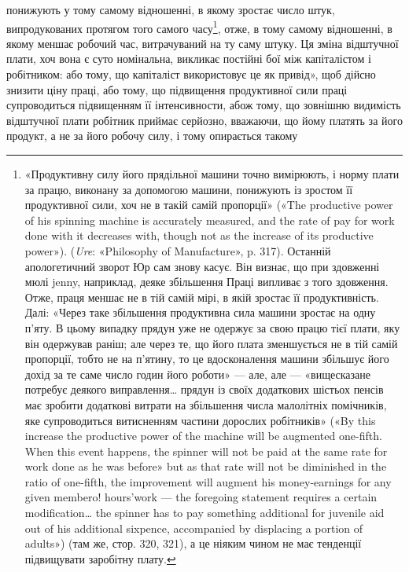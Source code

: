 \parcont{}  %
понижують у тому самому відношенні, в якому зростає число
штук, випродукованих протягом того самого часу\footnote{
«Продуктивну силу його прядільної машини точно вимірюють,
і норму плати за працю, виконану за допомогою машини, понижують
із зростом її продуктивної сили, хоч не в такій самій пропорції» («The
productive power of his spinning machine is accurately measured, and the
rate of pay for work done with it decreases with, though not as the increase
of its productive power»). (\emph{Ure}: «Philosophy of Manufacture», p. 317).
Останній апологетичний зворот Юр сам знову касує. Він визнає, що при
здовженні мюлі jenny, наприклад, деяке збільшення Праці випливає
з того здовження. Отже, праця меншає не в тій самій мірі, в якій зростає
її продуктивність. Далі: «Через таке збільшення продуктивна сила машини
зростає на одну п’яту. В цьому випадку прядун уже не одержує
за свою працю тієї плати, яку він одержував раніш; але через те, що його
плата зменшується не в тій самій пропорції, тобто не на п’ятину, то це
вдосконалення машини збільшує його дохід за те саме число годин його
роботи» — але, але — «вищесказане потребує деякого виправлення\dots{}
прядун із своїх додаткових шістьох пенсів має зробити додаткові витрати
на збільшення числа малолітніх помічників, яке супроводиться витисненням
частини дорослих робітників» («By this increase the productive power
of the machine will be augmented one-fifth. When this event happens,
the spinner will not be paid at the same rate for work done as he was before»
but as that rate will not be diminished in the ratio of one-fifth, the improvement
will augment his money-earnings for any given membero! hours’work
— the foregoing statement requires a certain modification\dots{} the spinner
has to pay something additional for juvenile aid out of his additional
sixpence, accompanied by displacing a portion of adults») (там же, стор. 320,
321), а це ніяким чином не має тенденції підвищувати заробітну плату.
}, отже, в тому
самому відношенні, в якому меншає робочий час, витрачуваний
на ту саму штуку. Ця зміна відштучної плати, хоч вона є суто
номінальна, викликає постійні бої між капіталістом і робітником:
або тому, що капіталіст використовує це як привід»,
щоб дійсно знизити ціну праці, або тому, що підвищення продуктивної
сили праці супроводиться підвищенням її інтенсивности,
абож тому, що зовнішню видимість відштучної плати
робітник приймає серйозно, вважаючи, що йому платять за його
продукт, а не за його робочу силу, і тому опирається такому
